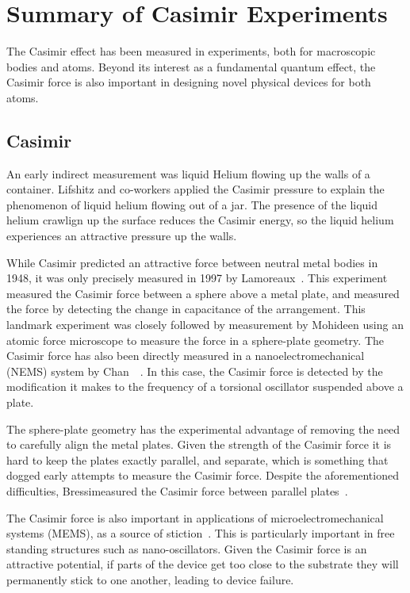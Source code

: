 \section{Summary of Casimir Experiments}
\label{sec:expt_review}
The Casimir effect has been measured in experiments, both for macroscopic bodies and atoms.
Beyond its interest as a fundamental quantum effect, the Casimir force is also important 
in designing novel physical devices for both atoms.

\subsection{Casimir}
An early indirect measurement was liquid Helium flowing up the walls of a container.  
Lifshitz and co-workers applied the Casimir pressure to explain the phenomenon of liquid helium
flowing out of a jar.  The presence of the liquid helium crawlign up the surface reduces the Casimir energy,
so the liquid helium experiences an attractive pressure up the walls.  

While Casimir predicted an attractive force between neutral metal bodies in 1948,
it was only precisely measured in 1997 by Lamoreaux~\cite{Lamoreaux1997}.   
This experiment measured the Casimir force between a sphere above a metal plate,
and measured the force by detecting the change in capacitance of the arrangement.  
This landmark experiment was closely followed by measurement by Mohideen\etal\cite{Mohideen1998}
using an atomic force microscope to measure the force in a sphere-plate geometry.  
The Casimir force has also been directly measured in a nanoelectromechanical (NEMS) system 
by Chan~\etal~\cite{Chan2001}.  In this case, the Casimir force is detected by the modification it
makes to the frequency of a torsional oscillator suspended above a plate.  

The sphere-plate geometry has the experimental advantage of removing the need to carefully
align the metal plates. Given the strength of the Casimir force it is hard to keep the plates exactly parallel,
and separate, which is something that dogged early attempts to measure the Casimir force.
Despite the aforementioned difficulties, Bressi\etal measured the Casimir force between parallel plates~\cite{Bressi2002}.  

The Casimir force is also important in applications of microelectromechanical systems (MEMS), 
as a source of stiction~\cite{Tas1996, Serry1998, Buks2001}.  This is particularly important
in free standing structures such as nano-oscillators.  
Given the Casimir force is an attractive potential, if parts of the device get too close to the substrate
they will permanently stick to one another, leading to device failure.  

